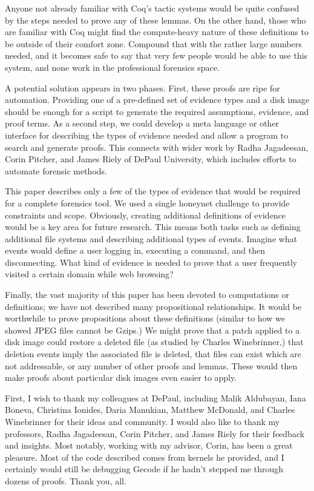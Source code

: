 \documentclass[nocopyrightspace]{sigplanconf}
\begin{document}
Anyone not already familiar with Coq's tactic systems would be quite confused
by the steps needed to prove any of these lemmas. On the other hand, those who
are familiar with Coq might find the compute-heavy nature of these definitions
to be outside of their comfort zone. Compound that with the rather large
numbers needed, and it becomes safe to say that very few people would be able
to use this system, and none work in the professional forensics space.

A potential solution appears in two phases. First, these proofs are ripe for
automation. Providing one of a pre-defined set of evidence types and a disk
image should be enough for a script to generate the required assumptions,
evidence, and proof terms. As a second step, we could develop a meta language
or other interface for describing the types of evidence needed and allow a
program to search and generate proofs. This connects with wider work by Radha
Jagadeesan, Corin Pitcher, and James Riely of DePaul University, which
includes efforts to automate forensic methods.

This paper describes only a few of the types of evidence that would be
required for a complete forensics tool. We used a single honeynet challenge to
provide constraints and scope. Obviously, creating additional definitions of
evidence would be a key area for future research. This means both tasks such
as defining additional file systems and describing additional types of events.
Imagine what events would define a user logging in, executing a command, and
then disconnecting. What kind of evidence is needed to prove that a user
frequently visited a certain domain while web browsing?

Finally, the vast majority of this paper has been devoted to computations or
definitions; we have not described many propositional relationships. It would
be worthwhile to prove propositions about these definitions (similar to how we
showed JPEG files cannot be Gzips.) We might prove that a patch applied to a
disk image could restore a deleted file (as studied by Charles Winebrinner,)
that deletion events imply the associated file is deleted, that files can
exist which are not addressable, or any number of other proofs and lemmas.
These would then make proofs about particular disk images even easier to
apply.

\acks
First, I wish to thank my colleagues at DePaul, including Malik Aldubayan,
Iana Boneva, Christina Ionides, Daria Manukian, Matthew McDonald, and Charles
Winebrinner for their ideas and community. I would also like to thank my
professors, Radha Jagadeesan, Corin Pitcher, and James Riely for their
feedback and insights. Most notably, working with my advisor, Corin, has been
a great pleasure. Most of the code described comes from kernels he provided,
and I certainly would still be debugging Gecode if he hadn't stepped me
through dozens of proofs. Thank you, all.
\end{document}
